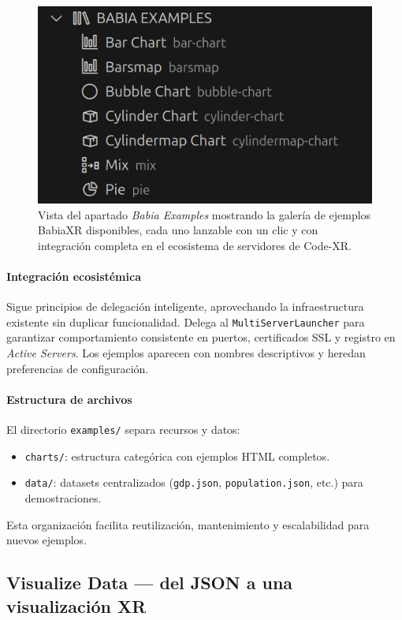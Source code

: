 \documentclass[a4paper, 12pt]{book}
\begin{document}
\begin{figure}[H]
\centering
\includegraphics[width=0.55\linewidth]{img/ui-babia-examples.png}
\caption{Vista del apartado \emph{Babia Examples} mostrando la galería de ejemplos BabiaXR disponibles, cada uno lanzable con un clic y con integración completa en el ecosistema de servidores de Code-XR.}
\label{fig:ui-babia-examples}
\end{figure}

\paragraph{Integración ecosistémica}
Sigue principios de delegación inteligente, aprovechando la infraestructura existente sin duplicar funcionalidad. Delega al \texttt{MultiServerLauncher} para garantizar comportamiento consistente en puertos, certificados SSL y registro en \emph{Active Servers}. Los ejemplos aparecen con nombres descriptivos y heredan preferencias de configuración.

\paragraph{Estructura de archivos}
El directorio \texttt{examples/} separa recursos y datos:
\begin{itemize}
  \item \texttt{charts/}: estructura categórica con ejemplos HTML completos.
  \item \texttt{data/}: datasets centralizados (\texttt{gdp.json}, \texttt{population.json}, etc.) para demostraciones.
\end{itemize}

Esta organización facilita reutilización, mantenimiento y escalabilidad para nuevos ejemplos.


\subsection{Visualize Data — del JSON a una visualización XR}
\label{sec:visualize-data}
\end{document}
